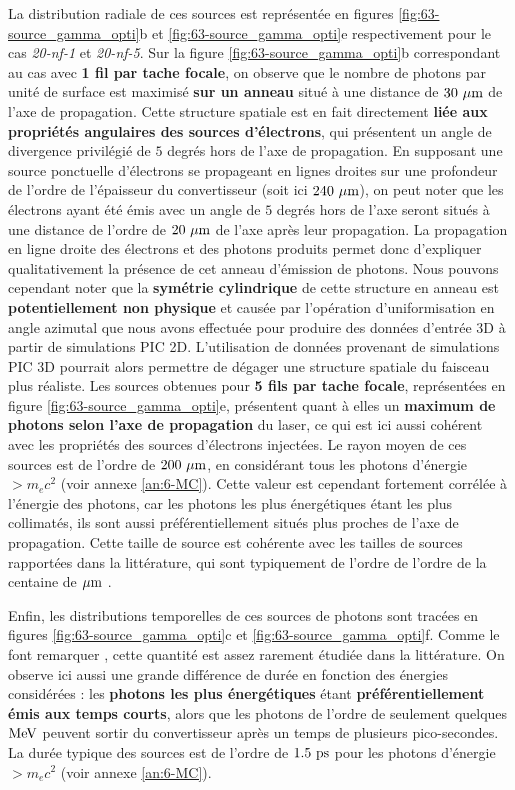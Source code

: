 \begin{refsection}
La distribution radiale de ces sources est représentée en figures \ref{fig:63-source_gamma_opti}b et \ref{fig:63-source_gamma_opti}e respectivement pour le cas \textit{20-nf-1} et \textit{20-nf-5}. Sur la figure \ref{fig:63-source_gamma_opti}b correspondant au cas avec \textbf{1 fil par tache focale}, on observe que le nombre de photons par unité de surface est maximisé \textbf{sur un anneau} situé à une distance de $30 ~ \rm \mu m$ de l'axe de propagation. Cette structure spatiale est en fait directement \textbf{liée aux propriétés angulaires des sources d'électrons}, qui présentent un angle de divergence privilégié de $5$ degrés hors de l'axe de propagation. En supposant une source ponctuelle d'électrons se propageant en lignes droites sur une profondeur de l'ordre de l'épaisseur du convertisseur (soit ici $240 ~ \rm \mu m$), on peut noter que les électrons ayant été émis avec un angle de $5$ degrés hors de l'axe seront situés à une distance de l'ordre de $20 ~ \rm \mu m$ de l'axe après leur propagation. La propagation en ligne droite des électrons et des photons produits permet donc d'expliquer qualitativement la présence de cet anneau d'émission de photons. Nous pouvons cependant noter que la \textbf{symétrie cylindrique} de cette structure en anneau est \textbf{potentiellement non physique} et causée par l'opération d'uniformisation en angle azimutal que nous avons effectuée pour produire des données d'entrée 3D à partir de simulations PIC 2D. L'utilisation de données provenant de simulations PIC 3D pourrait alors permettre de dégager une structure spatiale du faisceau plus réaliste. Les sources obtenues pour \textbf{5 fils par tache focale}, représentées en figure \ref{fig:63-source_gamma_opti}e, présentent quant à elles un \textbf{maximum de photons selon l'axe de propagation} du laser, ce qui est ici aussi cohérent avec les propriétés des sources d'électrons injectées. Le rayon moyen de ces sources est de l'ordre de $200 ~ \rm \mu m$, en considérant tous les photons d'énergie $> m_e c^2$  (voir annexe \ref{an:6-MC}). Cette valeur est cependant fortement corrélée à l'énergie des photons, car les photons les plus énergétiques étant les plus collimatés, ils sont aussi préférentiellement situés plus proches de l'axe de propagation. Cette taille de source est cohérente avec les tailles de sources rapportées dans la littérature, qui sont typiquement de l'ordre de l'ordre de la centaine de $\rm \mu m$ \parencite{ben-ismail_2011, glinec_2005, palaniyappan_2019}.

Enfin, les distributions temporelles de ces sources de photons sont tracées en figures \ref{fig:63-source_gamma_opti}c et \ref{fig:63-source_gamma_opti}f. Comme le font remarquer \cite{vyskocil_2018}, cette quantité est assez rarement étudiée dans la littérature. On observe ici aussi une grande différence de durée en fonction des énergies considérées : les \textbf{photons les plus énergétiques} étant \textbf{préférentiellement émis aux temps courts}, alors que les photons de l'ordre de seulement quelques $\rm MeV$ peuvent sortir du convertisseur après un temps de plusieurs pico-secondes. La durée typique des sources est de l'ordre de $1.5 ~ \rm ps$ pour les photons d'énergie $>m_e c^2$ (voir annexe \ref{an:6-MC}).


\end{refsection}
